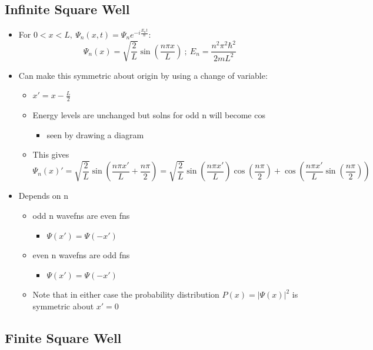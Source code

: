 \documentclass[a4paper,11pt,normalem]{article}
\begin{document}
\subsection{Infinite Square Well}\label{infinite-square-well}
\begin{itemize}
\item
  For
  \(0 < x < L,~ \Psi_{n}(x,t) = \Psi_{n}e^{-i\frac{E_{n}t}{\hbar}}\): \[
  \Psi_{n}(x) = \sqrt{\frac{2}{L}}\sin(\frac{n\pi x}{L}) ~;~ E_n = \frac{n^{2}\pi^{2}\hbar^2}{2mL^2}
  \]
\item
  Can make this symmetric about origin by using a change of variable:
  \begin{itemize}
  \item
    \(x' = x - \frac{L}{2}\)
  \item
    Energy levels are unchanged but solns for odd n will become cos
    \begin{itemize}
    \item
      seen by drawing a diagram
    \end{itemize}
  \item
    This gives \[
    \Psi_{n}(x)' = \sqrt{\frac{2}{L}}\sin(\frac{n\pi x'}{L} + \frac{n\pi}{2}) = \sqrt{\frac{2}{L}}\sin(\frac{n\pi x'}{L})\cos(\frac{n\pi}{2}) + \cos(\frac{n\pi x'}{L}\sin(\frac{n\pi}{2}))
    \]
  \end{itemize}
\item
  Depends on n
  \begin{itemize}
  \item
    odd n wavefns are even fns
    \begin{itemize}
    \item
      \(\Psi(x') = \Psi(-x')\)
    \end{itemize}
  \item
    even n wavefns are odd fns
    \begin{itemize}
    \item
      \(\Psi(x') = \Psi(-x')\)
    \end{itemize}
  \item
    Note that in either case the probability distribution
    \(P(x) = |\Psi(x)|^2\) is symmetric about \(x' = 0\)
  \end{itemize}
\end{itemize}

\subsection{Finite Square Well}\label{finite-square-well}
\end{document}
